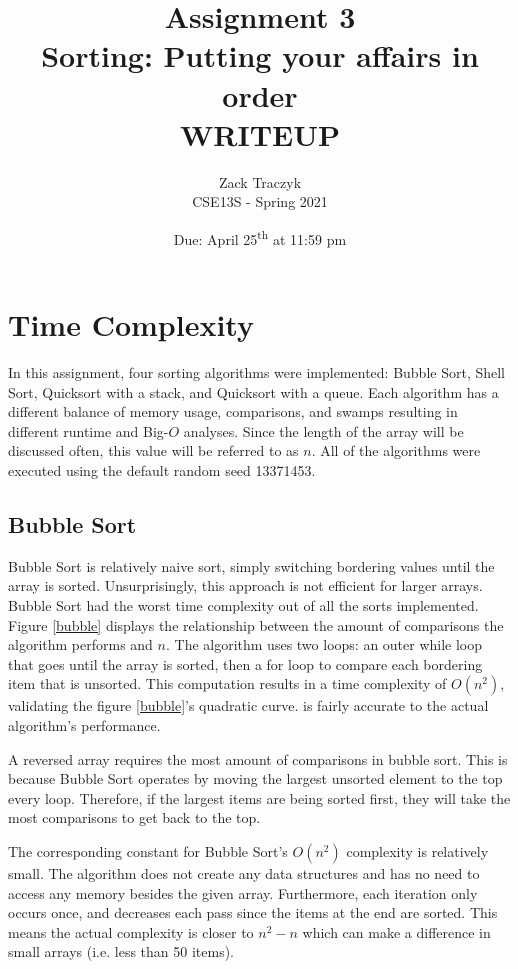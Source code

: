 \documentclass[12pt]{article}
\title{%
	\textbf{Assignment 3 \\ 
	Sorting: Putting your affairs in order \\
	\large WRITEUP} }
\author{Zack Traczyk \\ CSE13S - Spring 2021}
\date{Due: April 25\textsuperscript{th} at 11:59 pm}
\begin{document}
	\maketitle

	\section{Time Complexity}

	In this assignment, four sorting algorithms were implemented:
	Bubble Sort, Shell Sort, Quicksort with a stack, and Quicksort with a queue.
	Each algorithm has a different balance of memory usage, comparisons, and swamps resulting in different runtime and Big-$O$ analyses.
	Since the length of the array will be discussed often, this value will be referred to as $n$.
	All of the algorithms were executed using the default random seed 13371453.

	\pagebreak


	\subsection{Bubble Sort}

	Bubble Sort is relatively naive sort, simply switching bordering values until the array is sorted.
	Unsurprisingly, this approach is not efficient for larger arrays.
	Bubble Sort had the worst time complexity out of all the sorts implemented.
	Figure \ref{bubble} displays the relationship between the amount of comparisons the algorithm performs and $n$.
	The algorithm uses two loops:
	an outer while loop that goes until the array is sorted,
	then a for loop to compare each bordering item that is unsorted.
	This computation results in a time complexity of $O(n^2)$, validating the figure \ref{bubble}'s quadratic curve.
	is fairly accurate to the actual algorithm's performance.

	A reversed array requires the most amount of comparisons in bubble sort.
	This is because Bubble Sort operates by moving the largest unsorted element to the top every loop.
	Therefore, if the largest items are being sorted first, they will take the most comparisons to get back to the top.

	The corresponding constant for Bubble Sort's $O(n^2)$ complexity is relatively small.
	The algorithm does not create any data structures and has no need to access any memory besides the given array.
	Furthermore, each iteration only occurs once, and decreases each pass since the items at the end are sorted.
	This means the actual complexity is closer to $n^2 - n$ which can make a difference in small arrays (i.e. less than 50 items). 
\end{document}
